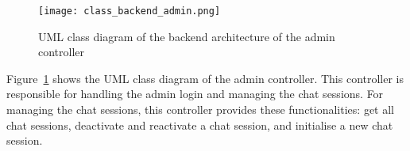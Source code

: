 \begin{figure}[h!]
    \centering
    \texttt{[image: class\_backend\_admin.png]}
    \caption{UML class diagram of the backend architecture of the admin controller}
    \label{class_backend_admin}
\end{figure}

Figure~\ref{class_backend_admin} shows the UML class diagram of the admin controller.
This controller is responsible for handling the admin login and managing the chat sessions.
For managing the chat sessions, this controller provides these functionalities: get all chat sessions, deactivate and reactivate a chat session, and initialise a new chat session.










